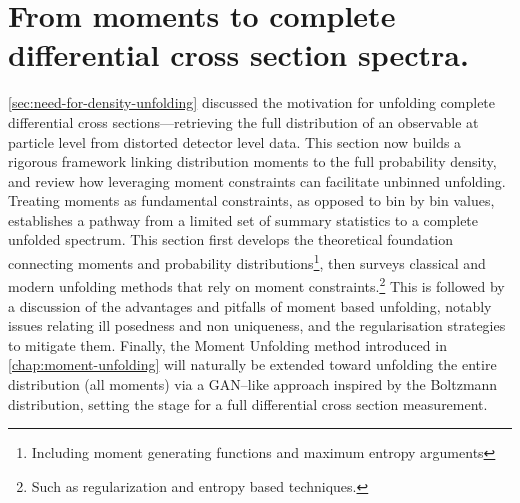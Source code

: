 {{\section{From moments to complete differential cross section spectra.}
    \cref{sec:need-for-density-unfolding} discussed the motivation for unfolding complete differential cross sections---retrieving the full distribution of an observable at particle level from distorted detector level data.
    This section now builds a rigorous framework linking distribution moments to the full probability density, and review how leveraging moment constraints can facilitate unbinned unfolding.
    Treating moments as fundamental constraints, as opposed to bin by bin values, establishes a pathway from a limited set of summary statistics to a complete unfolded spectrum.
    This section first develops the theoretical foundation connecting moments and probability distributions\footnote{Including moment generating functions and maximum entropy arguments}, then surveys classical and modern unfolding methods that rely on moment constraints.\footnote{Such as regularization and entropy based techniques.}
    This is followed by a discussion of the advantages and pitfalls of moment based unfolding, notably issues relating ill posedness and non uniqueness, and the regularisation strategies to mitigate them.
    Finally, the Moment Unfolding method introduced in \cref{chap:moment-unfolding} will naturally be extended toward unfolding the entire distribution (all moments) via a GAN--like approach inspired by the Boltzmann distribution, setting the stage for a full differential cross section measurement.

}}
